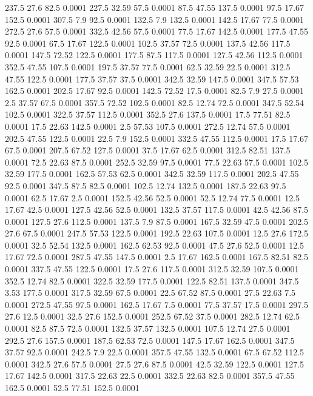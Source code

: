 237.5	27.6	82.5	0.0001
227.5	32.59	57.5	0.0001
87.5	47.55	137.5	0.0001
97.5	17.67	152.5	0.0001
307.5	7.9	92.5	0.0001
132.5	7.9	132.5	0.0001
142.5	17.67	77.5	0.0001
272.5	27.6	57.5	0.0001
332.5	42.56	57.5	0.0001
77.5	17.67	142.5	0.0001
177.5	47.55	92.5	0.0001
67.5	17.67	122.5	0.0001
102.5	37.57	72.5	0.0001
137.5	42.56	117.5	0.0001
147.5	72.52	122.5	0.0001
177.5	87.5	117.5	0.0001
127.5	42.56	112.5	0.0001
352.5	47.55	107.5	0.0001
197.5	37.57	77.5	0.0001
62.5	32.59	22.5	0.0001
312.5	47.55	122.5	0.0001
177.5	37.57	37.5	0.0001
342.5	32.59	147.5	0.0001
347.5	57.53	162.5	0.0001
202.5	17.67	92.5	0.0001
142.5	72.52	17.5	0.0001
82.5	7.9	27.5	0.0001
2.5	37.57	67.5	0.0001
357.5	72.52	102.5	0.0001
82.5	12.74	72.5	0.0001
347.5	52.54	102.5	0.0001
322.5	37.57	112.5	0.0001
352.5	27.6	137.5	0.0001
17.5	77.51	82.5	0.0001
17.5	22.63	142.5	0.0001
2.5	57.53	107.5	0.0001
272.5	12.74	57.5	0.0001
202.5	47.55	122.5	0.0001
22.5	7.9	152.5	0.0001
332.5	47.55	112.5	0.0001
17.5	17.67	67.5	0.0001
207.5	67.52	127.5	0.0001
37.5	17.67	62.5	0.0001
312.5	82.51	137.5	0.0001
72.5	22.63	87.5	0.0001
252.5	32.59	97.5	0.0001
77.5	22.63	57.5	0.0001
102.5	32.59	177.5	0.0001
162.5	57.53	62.5	0.0001
342.5	32.59	117.5	0.0001
202.5	47.55	92.5	0.0001
347.5	87.5	82.5	0.0001
102.5	12.74	132.5	0.0001
187.5	22.63	97.5	0.0001
62.5	17.67	2.5	0.0001
152.5	42.56	52.5	0.0001
52.5	12.74	77.5	0.0001
12.5	17.67	42.5	0.0001
127.5	42.56	52.5	0.0001
132.5	37.57	117.5	0.0001
42.5	42.56	87.5	0.0001
127.5	27.6	112.5	0.0001
137.5	7.9	87.5	0.0001
167.5	32.59	47.5	0.0001
202.5	27.6	67.5	0.0001
247.5	57.53	122.5	0.0001
192.5	22.63	107.5	0.0001
12.5	27.6	172.5	0.0001
32.5	52.54	132.5	0.0001
162.5	62.53	92.5	0.0001
47.5	27.6	52.5	0.0001
12.5	17.67	72.5	0.0001
287.5	47.55	147.5	0.0001
2.5	17.67	162.5	0.0001
167.5	82.51	82.5	0.0001
337.5	47.55	122.5	0.0001
17.5	27.6	117.5	0.0001
312.5	32.59	107.5	0.0001
352.5	12.74	82.5	0.0001
322.5	32.59	177.5	0.0001
122.5	82.51	137.5	0.0001
347.5	3.53	177.5	0.0001
317.5	32.59	67.5	0.0001
22.5	67.52	87.5	0.0001
27.5	22.63	7.5	0.0001
272.5	47.55	97.5	0.0001
162.5	17.67	7.5	0.0001
77.5	37.57	17.5	0.0001
297.5	27.6	12.5	0.0001
32.5	27.6	152.5	0.0001
252.5	67.52	37.5	0.0001
282.5	12.74	62.5	0.0001
82.5	87.5	72.5	0.0001
132.5	37.57	132.5	0.0001
107.5	12.74	27.5	0.0001
292.5	27.6	157.5	0.0001
187.5	62.53	72.5	0.0001
147.5	17.67	162.5	0.0001
347.5	37.57	92.5	0.0001
242.5	7.9	22.5	0.0001
357.5	47.55	132.5	0.0001
67.5	67.52	112.5	0.0001
342.5	27.6	57.5	0.0001
27.5	27.6	87.5	0.0001
42.5	32.59	122.5	0.0001
127.5	17.67	142.5	0.0001
317.5	22.63	22.5	0.0001
332.5	22.63	82.5	0.0001
357.5	47.55	162.5	0.0001
52.5	77.51	152.5	0.0001
